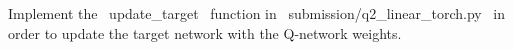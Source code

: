 \item {}
Implement the ~update_target~ function in ~submission/q2_linear_torch.py~ in order to update the target network with the Q-network weights.